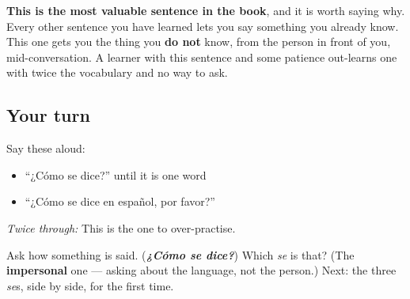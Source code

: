 \textbf{This is the most valuable sentence in the book}, and it is worth saying why. Every other sentence you have learned lets you say something you already know. This one gets you the thing you \textbf{do not} know, from the person in front of you, mid-conversation. A learner with this sentence and some patience out-learns one with twice the vocabulary and no way to ask.

\subsection*{Your turn}
Say these aloud:

\begin{itemize}
\raggedright
  \item \textquotedblleft{}¿Cómo se dice?\textquotedblright{} until it is one word
  \item \textquotedblleft{}¿Cómo se dice en español, por favor?\textquotedblright{}
\end{itemize}

\emph{Twice through:} This is the one to over-practise.

\begin{tcolorbox}[breakable,colback=teal!4,colframe=teal!35!black,title={Before you move on}]
Ask how something is said. (\emph{\textbf{¿Cómo se dice?}}) Which \emph{se} is that? (The \textbf{impersonal} one — asking about the language, not the person.) Next: the three \emph{se}s, side by side, for the first time.
\end{tcolorbox}

